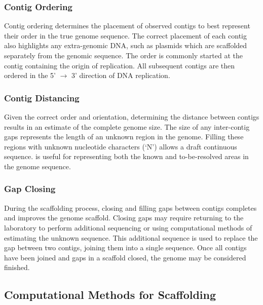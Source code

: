 \documentclass[10pt]{bmc_article}
\newenvironment{bmcformat}{\begin{raggedright}\baselineskip20pt\sloppy\setboolean{publ}{false}}{\end{raggedright}\baselineskip20pt\sloppy}
\begin{document}
\begin{bmcformat}
\subsubsection*{Contig Ordering} %

Contig ordering determines the placement of observed contigs to best represent
their order in the true genome sequence. The correct placement of each contig
also highlights any extra-genomic DNA, such as plasmids which are scaffolded
separately from the genomic sequence. The order is commonly started at the
contig containing the origin of replication. All subsequent contigs are then
ordered in the 5' $\rightarrow$ 3' direction of DNA replication.

\subsubsection*{Contig Distancing} %

Given the correct order and orientation, determining the distance between
contigs results in an estimate of the complete genome size. The size of any
inter-contig gaps represents the length of an unknown region in the genome.
Filling these regions with unknown nucleotide characters (`N') allows a draft
continuous sequence.  is useful for representing
both the known and to-be-resolved areas in the genome sequence.

\subsubsection*{Gap Closing} %

During the scaffolding process, closing and filling gaps between contigs
completes and improves the genome scaffold. Closing gaps may require returning
to the laboratory to perform additional sequencing or using computational
methods of estimating the unknown sequence. This additional sequence is
used to replace the gap between two contigs, joining them into
a single sequence. Once all contigs have been joined and gaps in a scaffold
closed, the genome may be considered finished.

\subsection*{Computational Methods for Scaffolding} %


\end{bmcformat}
\end{document}
